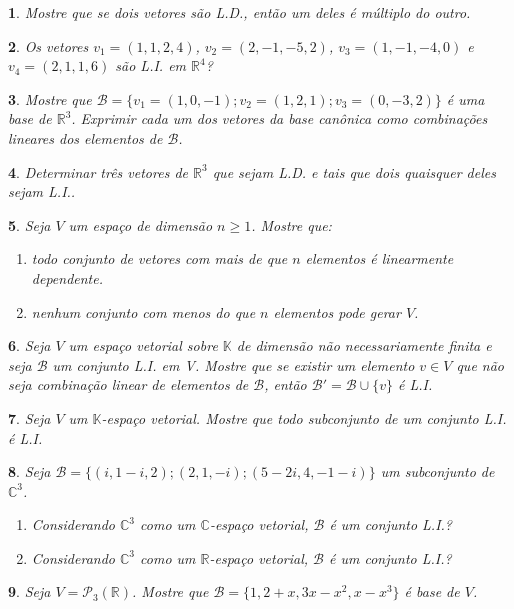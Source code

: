 \documentclass[12pt]{exam}
\newtheorem{exercicio}{}
\newcommand{\real}{\mathbb{R}}
\newcommand{\complex}{\mathbb{C}}
\newcommand{\cp}[1]{\mathbb{#1}}
\begin{document}
\begin{exercicio}
  Mostre que se dois vetores s\~ao L.D., então um deles \'e m\'ultiplo do outro.
\end{exercicio}

\begin{exercicio}
  Os vetores $v_1 = (1,1,2,4)$, $v_2 = (2,-1,-5,2)$, $v_3 = (1,-1,-4,0)$ e $v_4 = (2,1,1,6)$ s\~ao L.I. em $\real^4$?
\end{exercicio}

\begin{exercicio}
  Mostre que $\mathcal{B} = \{v_1 = (1,0,-1);v_2=(1,2,1);v_3=(0,-3,2)\}$ \'e uma base de $\real^3$. Exprimir cada um dos vetores da base can\^onica como combina\c{c}\~oes lineares dos elementos de $\mathcal{B}$.
\end{exercicio}

\begin{exercicio}
  Determinar tr\^es vetores de $\real^3$ que sejam L.D. e tais que dois quaisquer deles sejam L.I..
\end{exercicio}

\begin{exercicio}
  Seja $V$ um espa\c{c}o de dimens\~ao $n \ge 1$. Mostre que:
  \begin{enumerate}[label={\alph*})]
    \item todo conjunto de vetores com mais de que $n$ elementos \'e linearmente dependente.
    \item nenhum conjunto com menos do que $n$ elementos pode gerar $V$.
  \end{enumerate}
\end{exercicio}

\begin{exercicio}
  Seja $V$ um espa\c{c}o vetorial sobre $\cp{K}$ de dimens\~ao n\~ao necessariamente finita e seja $\mathcal{B}$ um conjunto L.I. em V. Mostre que se existir um elemento $v \in V$ que n\~ao seja combina\c{c}\~ao linear de elementos de $\mathcal{B}$, ent\~ao $\mathcal{B}' = \mathcal{B} \cup \{v\}$ \'e L.I.
\end{exercicio}

\begin{exercicio}
  Seja $V$ um $\cp{K}$-espa\c{c}o vetorial. Mostre que todo subconjunto de um conjunto L.I. \'e L.I.
\end{exercicio}

\begin{exercicio}
  Seja $\mathcal{B} = \{(i, 1-i, 2); (2,1,-i);(5-2i,4,-1-i)\}$ um subconjunto de $\complex^3$.
  \begin{enumerate}[label={\alph*})]
    \item Considerando $\complex^3$ como um $\complex$-espa\c{c}o vetorial, $\mathcal{B}$ \'e um conjunto L.I.?
    \item Considerando $\complex^3$ como um $\real$-espa\c{c}o vetorial, $\mathcal{B}$ \'e um conjunto L.I.?
  \end{enumerate}
\end{exercicio}

\begin{exercicio}
  Seja $V = \mathcal{P}_3(\real)$. Mostre que $\mathcal{B} = \{1, 2+x, 3x-x^2,x-x^3\}$ \'e base de $V$.
\end{exercicio}

% 
\end{document}
